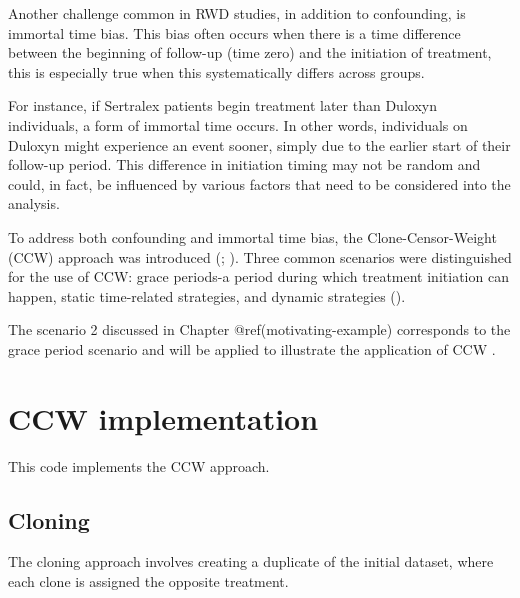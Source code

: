 \documentclass[
]{book}
\begin{document}
Another challenge common in RWD studies, in addition to confounding, is
immortal time bias. This bias often occurs when there is a time
difference between the beginning of follow-up (time zero) and the
initiation of treatment, this is especially true when this
systematically differs across groups.

For instance, if Sertralex patients begin treatment later than Duloxyn
individuals, a form of immortal time occurs. In other words, individuals
on Duloxyn might experience an event sooner, simply due to the earlier
start of their follow-up period. This difference in initiation timing
may not be random and could, in fact, be influenced by various factors
that need to be considered into the analysis.

To address both confounding and immortal time bias, the
Clone-Censor-Weight (CCW) approach was introduced
(;
). Three
common scenarios were distinguished for the use of CCW: grace periods-a
period during which treatment initiation can happen, static time-related
strategies, and dynamic strategies
().

The scenario 2 discussed in Chapter @ref(motivating-example) corresponds
to the grace period scenario and will be applied to illustrate the
application of CCW .

\section{CCW implementation}\label{ccw-implementation}

This code implements the CCW approach.

\subsection{Cloning}\label{cloning}

The cloning approach involves creating a duplicate of the initial
dataset, where each clone is assigned the opposite treatment.
\end{document}
